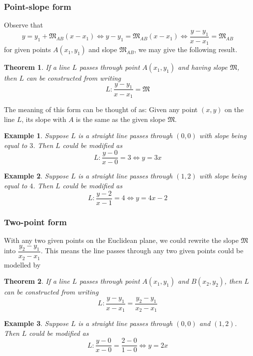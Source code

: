 \documentclass[12pt]{article}
\newtheorem*{theorem}{Theorem}
\newtheorem*{example}{Example}
\begin{document}
    \subsubsection*{Point-slope form}

    Observe that $$y=y_1+\mathfrak{M}_{AB}(x-x_1) \iff y-y_1=\mathfrak{M}_{AB}(x-x_1) \iff \frac{y-y_1}{x-x_1}=\mathfrak{M}_{AB}$$ for given points $A(x_1,y_1)$ and slope $\mathfrak{M}_{AB}$, we may give the following result.

    \begin{theorem}
        If a line $L$ passes through point $A(x_1,y_1)$ and having slope $\mathfrak{M}$, then $L$ can be constructed from writing $$L:\frac{y-y_1}{x-x_1}=\mathfrak{M}$$
    \end{theorem}

    The meaning of this form can be thought of as: Given any point $(x,y)$ on the line $L$, its slope with $A$ is the same as the given slope $\mathfrak{M}$.

    \begin{example}
        Suppose $L$ is a straight line passes through $(0,0)$ with slope being equal to $3$. Then $L$ could be modified as $$L:\frac{y-0}{x-0}=3\iff y=3x$$
    \end{example}
    
    \begin{example}
        Suppose $L$ is a straight line passes through $(1,2)$ with slope being equal to $4$. Then $L$ could be modified as $$L:\frac{y-2}{x-1}=4\iff y=4x-2$$
    \end{example}

    \subsubsection*{Two-point form}

    With any two given points on the Euclidean plane, we could rewrite the slope $\mathfrak{M}$ into $\dfrac{y_2-y_1}{x_2-x_1}$. This means the line passes through any two given points could be modelled by 

    \begin{theorem}
        If a line $L$ passes through point $A(x_1,y_1)$ and $B(x_2,y_2)$, then $L$ can be constructed from writing $$L:\frac{y-y_1}{x-x_1}=\frac{y_2-y_1}{x_2-x_1}$$
    \end{theorem}

    \begin{example}
        Suppose $L$ is a straight line passes through $(0,0)$ and $(1,2)$. Then $L$ could be modified as $$L:\frac{y-0}{x-0}=\frac{2-0}{1-0}\iff y=2x$$
    \end{example}
    
\end{document}
